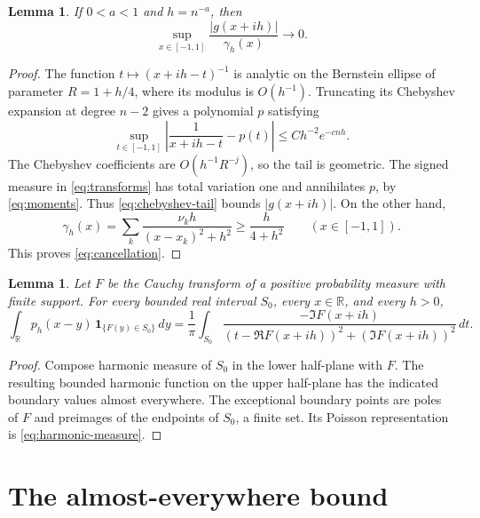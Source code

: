 \documentclass[11pt]{article}
\newtheorem{lemma}[theorem]{Lemma}
\numberwithin{equation}{section}
\newcommand{\R}{\mathbb R}
\begin{document}
\begin{lemma}\label{lem:cancellation}
If \(0<a<1\) and \(h=n^{-a}\), then
\begin{equation}\label{eq:cancellation}
 \sup_{x\in[-1,1]}\frac{|g(x+ih)|}{\gamma_h(x)}\longrightarrow0.
\end{equation}
\end{lemma}

\begin{proof}
The function \(t\mapsto(x+ih-t)^{-1}\) is analytic on the Bernstein ellipse of
parameter \(R=1+h/4\), where its modulus is \(O(h^{-1})\). Truncating its
Chebyshev expansion at degree \(n-2\) gives a polynomial \(p\) satisfying
\begin{equation}\label{eq:chebyshev-tail}
 \sup_{t\in[-1,1]}\left|\frac1{x+ih-t}-p(t)\right|
 \le C h^{-2}e^{-cnh}.
\end{equation}
The Chebyshev coefficients are \(O(h^{-1}R^{-j})\), so the tail is geometric.
The signed measure in \eqref{eq:transforms} has total variation one and
annihilates \(p\), by \eqref{eq:moments}. Thus
\eqref{eq:chebyshev-tail} bounds \(|g(x+ih)|\). On the other hand,
\[
 \gamma_h(x)=\sum_k\frac{\nu_kh}{(x-x_k)^2+h^2}
 \ge\frac{h}{4+h^2}\qquad(x\in[-1,1]).
\]
This proves \eqref{eq:cancellation}.
\end{proof}

\begin{lemma}\label{lem:boundary}
Let \(F\) be the Cauchy transform of a positive probability measure with
finite support. For every bounded real interval \(S_0\), every \(x\in\R\), and
every \(h>0\),
\begin{equation}\label{eq:harmonic-measure}
 \int_{\mathbb R}p_h(x-y)\,
            \mathbf1_{\{F(y)\in S_0\}}\,dy
 =\frac1\pi\int_{S_0}
       \frac{-\Im F(x+ih)}{(t-\Re F(x+ih))^2+(\Im F(x+ih))^2}\,dt.
\end{equation}
\end{lemma}

\begin{proof}
Compose harmonic measure of \(S_0\) in the lower half-plane with \(F\). The
resulting bounded harmonic function on the upper half-plane has the indicated
boundary values almost everywhere. The exceptional boundary points are poles
of \(F\) and preimages of the endpoints of \(S_0\), a finite set. Its Poisson
representation is \eqref{eq:harmonic-measure}.
\end{proof}

\section{The almost-everywhere bound}\label{sec:ae}
\end{document}
